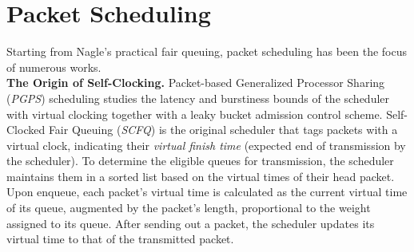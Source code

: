 \section{Packet Scheduling}

Starting from Nagle's \cite{nagle} practical fair queuing, packet scheduling has been the focus of numerous works.
\\
\textbf{The Origin of Self-Clocking.}
Packet-based Generalized Processor Sharing (\textit{PGPS}) scheduling \cite{gps} studies the latency and burstiness bounds of the scheduler with virtual clocking together with a leaky bucket admission control scheme. Self-Clocked Fair Queuing (\textit{SCFQ}) \cite{scfq} is the original scheduler that tags packets with a virtual clock, indicating their \textit{virtual finish time} (expected end of transmission by the scheduler).
To determine the eligible queues for transmission, the scheduler maintains them in a sorted list based on the virtual times of their head packet.
Upon enqueue, each packet's virtual time is calculated as the current virtual time of its queue, augmented by the packet's length, proportional to the weight assigned to its queue. After sending out a packet, the scheduler updates its virtual time to that of the transmitted packet.

